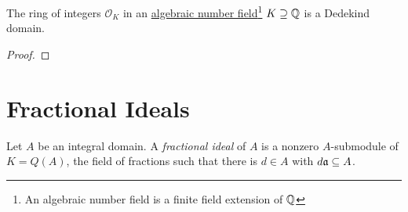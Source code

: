 \begin{theorem}
    The ring of integers $\mathcal{O}_K$ in an \underline{algebraic number field}\footnote{An algebraic number field is a finite field extension of $\mathbb{Q}$} $K\supseteq\mathbb{Q}$ is a Dedekind domain.
\end{theorem}
\begin{proof}

\end{proof}

\section{Fractional Ideals}

\begin{definition}
    Let $A$ be an integral domain. A \emph{fractional ideal} of $A$ is a nonzero $A$-submodule of $K = Q(A)$, the field of fractions such that there is $d\in A$ with $d\mathfrak a\subseteq A$.
\end{definition}